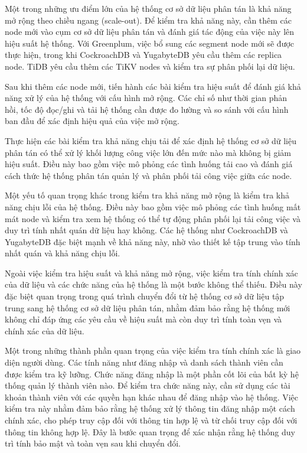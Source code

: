 \documentclass{article}[14pt]
\begin{document}
Một trong những ưu điểm lớn của hệ thống cơ sở dữ liệu phân tán là khả năng mở rộng theo chiều ngang (scale-out). Để kiểm tra khả năng này, cần thêm các node mới vào cụm cơ sở dữ liệu phân tán và đánh giá tác động của việc này lên hiệu suất hệ thống. Với Greenplum, việc bổ sung các segment node mới sẽ được thực hiện, trong khi CockroachDB và YugabyteDB yêu cầu thêm các replica node. TiDB yêu cầu thêm các TiKV nodes và kiểm tra sự phân phối lại dữ liệu.

Sau khi thêm các node mới, tiến hành các bài kiểm tra hiệu suất để đánh giá khả năng xử lý của hệ thống với cấu hình mở rộng. Các chỉ số như thời gian phản hồi, tốc độ đọc/ghi và tải hệ thống cần được đo lường và so sánh với cấu hình ban đầu để xác định hiệu quả của việc mở rộng.

Thực hiện các bài kiểm tra khả năng chịu tải để xác định hệ thống cơ sở dữ liệu phân tán có thể xử lý khối lượng công việc lớn đến mức nào mà không bị giảm hiệu suất. Điều này bao gồm việc mô phỏng các tình huống tải cao và đánh giá cách thức hệ thống phân tán quản lý và phân phối tải công việc giữa các node.

Một yếu tố quan trọng khác trong kiểm tra khả năng mở rộng là kiểm tra khả năng chịu lỗi của hệ thống. Điều này bao gồm việc mô phỏng các tình huống mất mát node và kiểm tra xem hệ thống có thể tự động phân phối lại tải công việc và duy trì tính nhất quán dữ liệu hay không. Các hệ thống như CockroachDB và YugabyteDB đặc biệt mạnh về khả năng này, nhờ vào thiết kế tập trung vào tính nhất quán và khả năng chịu lỗi.

Ngoài việc kiểm tra hiệu suất và khả năng mở rộng, việc kiểm tra tính chính xác của dữ liệu và các chức năng của hệ thống là một bước không thể thiếu. Điều này đặc biệt quan trọng trong quá trình chuyển đổi từ hệ thống cơ sở dữ liệu tập trung sang hệ thống cơ sở dữ liệu phân tán, nhằm đảm bảo rằng hệ thống mới không chỉ đáp ứng các yêu cầu về hiệu suất mà còn duy trì tính toàn vẹn và chính xác của dữ liệu.

Một trong những thành phần quan trọng của việc kiểm tra tính chính xác là giao diện người dùng. Các tính năng như đăng nhập và danh sách thành viên cần được kiểm tra kỹ lưỡng. Chức năng đăng nhập là một phần cốt lõi của bất kỳ hệ thống quản lý thành viên nào. Để kiểm tra chức năng này, cần sử dụng các tài khoản thành viên với các quyền hạn khác nhau để đăng nhập vào hệ thống. Việc kiểm tra này nhằm đảm bảo rằng hệ thống xử lý thông tin đăng nhập một cách chính xác, cho phép truy cập đối với thông tin hợp lệ và từ chối truy cập đối với thông tin không hợp lệ. Đây là bước quan trọng để xác nhận rằng hệ thống duy trì tính bảo mật và toàn vẹn sau khi chuyển đổi.
\end{document}
